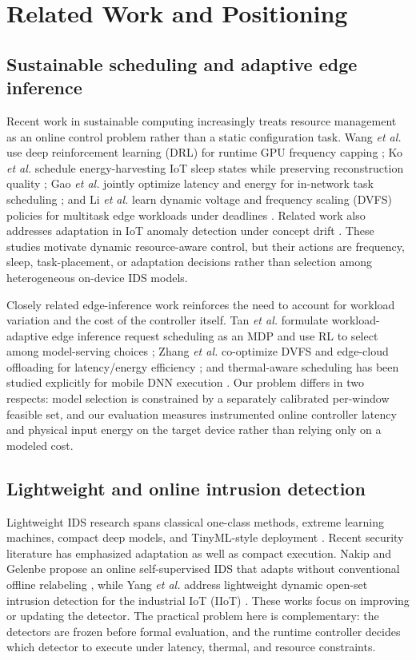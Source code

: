 \documentclass[journal]{IEEEtran}
\begin{document}
\section{Related Work and Positioning}
\subsection{Sustainable scheduling and adaptive edge inference}
Recent work in sustainable computing increasingly treats resource management as an online control problem rather than a static configuration task. Wang \emph{et al.} use deep reinforcement learning (DRL) for runtime GPU frequency capping \cite{wang2024drlcap}; Ko \emph{et al.} schedule energy-harvesting IoT sleep states while preserving reconstruction quality \cite{ko2025rass}; Gao \emph{et al.} jointly optimize latency and energy for in-network task scheduling \cite{gao2025inc}; and Li \emph{et al.} learn dynamic voltage and frequency scaling (DVFS) policies for multitask edge workloads under deadlines \cite{li2025dvfsedge}. Related work also addresses adaptation in IoT anomaly detection under concept drift \cite{xu2024conceptdrift}. These studies motivate dynamic resource-aware control, but their actions are frequency, sleep, task-placement, or adaptation decisions rather than selection among heterogeneous on-device IDS models.

Closely related edge-inference work reinforces the need to account for workload variation and the cost of the controller itself. Tan \emph{et al.} formulate workload-adaptive edge inference request scheduling as an MDP and use RL to select among model-serving choices \cite{tan2024workloadadaptive}; Zhang \emph{et al.} co-optimize DVFS and edge-cloud offloading for latency/energy efficiency \cite{zhang2024dvfo}; and thermal-aware scheduling has been studied explicitly for mobile DNN execution \cite{tan2024thermalnpu}. Our problem differs in two respects: model selection is constrained by a separately calibrated per-window feasible set, and our evaluation measures instrumented online controller latency and physical input energy on the target device rather than relying only on a modeled cost.

\subsection{Lightweight and online intrusion detection}
Lightweight IDS research spans classical one-class methods, extreme learning machines, compact deep models, and TinyML-style deployment \cite{tax2004svdd,huang2006elm,doriguzzi2020lucid,fusco2024tinyids,warden2019tinyml,lin2020mcunet}. Recent security literature has emphasized adaptation as well as compact execution. Nakip and Gelenbe propose an online self-supervised IDS that adapts without conventional offline relabeling \cite{nakip2024selfsupervised}, while Yang \emph{et al.} address lightweight dynamic open-set intrusion detection for the industrial IoT (IIoT) \cite{yang2025openset}. These works focus on improving or updating the detector. The practical problem here is complementary: the detectors are frozen before formal evaluation, and the runtime controller decides which detector to execute under latency, thermal, and resource constraints.
\end{document}
